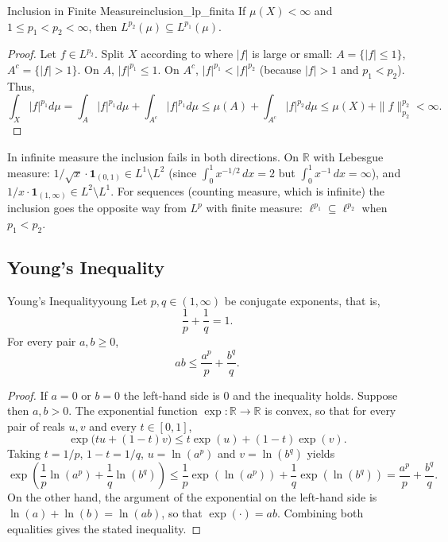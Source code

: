 \documentclass[11pt, a4paper]{article}
\begin{document}
\begin{proposicion}{Inclusion in Finite Measure}{inclusion_lp_finita}
If $\mu(X) < \infty$ and $1 \le p_1 < p_2 < \infty$, then $L^{p_2}(\mu) \subseteq L^{p_1}(\mu)$.
\end{proposicion}

\begin{proof}
Let $f \in L^{p_2}$. Split $X$ according to where $|f|$ is large or small: $A = \{|f| \le 1\}$,
$A^c = \{|f| > 1\}$. On $A$, $|f|^{p_1} \le 1$. On $A^c$, $|f|^{p_1} < |f|^{p_2}$ (because $|f| > 1$
and $p_1 < p_2$). Thus,
$$ \int_X |f|^{p_1} d\mu = \int_A |f|^{p_1} d\mu + \int_{A^c} |f|^{p_1} d\mu \le \mu(A) + \int_{A^c}
|f|^{p_2} d\mu \le \mu(X) + \|f\|_{p_2}^{p_2} < \infty. $$
\end{proof}

\obs In infinite measure the inclusion fails in both directions. On $\mathbb{R}$ with Lebesgue measure:
$1/\sqrt{x} \cdot \mathbf{1}_{(0,1)} \in L^1 \setminus L^2$ (since $\int_0^1 x^{-1/2}\,dx = 2$ but $\int_0^1 x^{-1}\,dx = \infty$), and
$1/x \cdot \mathbf{1}_{(1,\infty)} \in L^2 \setminus L^1$. For sequences (counting measure, which is
infinite) the inclusion goes the opposite way from $L^p$ with finite measure: $\ell^{p_1} \subseteq \ell^{p_2}$
when $p_1 < p_2$.

\subsection{Young's Inequality}

\begin{teorema}{Young's Inequality}{young}
Let $p, q \in (1, \infty)$ be conjugate exponents, that is,
$$ \frac{1}{p} + \frac{1}{q} = 1. $$
For every pair $a, b \ge 0$,
$$ ab \le \frac{a^p}{p} + \frac{b^q}{q}. $$
\end{teorema}

\begin{proof}
If $a = 0$ or $b = 0$ the left-hand side is $0$ and the inequality holds. Suppose then
$a, b > 0$. The
exponential function $\exp: \mathbb{R} \to \mathbb{R}$ is convex, so that for every pair of reals
$u, v$ and every $t \in [0, 1]$,
$$ \exp\big(tu + (1-t)v\big) \le t \exp(u) + (1-t)\exp(v). $$
Taking $t = 1/p$, $1 - t = 1/q$, $u = \ln(a^p)$ and $v = \ln(b^q)$ yields
$$ \exp\!\left(\frac{1}{p} \ln(a^p) + \frac{1}{q} \ln(b^q)\right)
\le \frac{1}{p} \exp(\ln(a^p)) + \frac{1}{q} \exp(\ln(b^q)) = \frac{a^p}{p} + \frac{b^q}{q}. $$
On the other hand, the argument of the exponential on the left-hand side is $\ln(a) + \ln(b) =
\ln(ab)$, so that $\exp(\cdot) = ab$. Combining both equalities gives the stated
inequality.
\end{proof}
\end{document}
